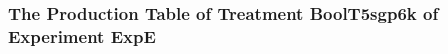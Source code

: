  \begin{frame}
 \fontsize{8pt}{9pt}\selectfont
 \frametitle{ The Production Table of Treatment BoolT5sgp6k of Experiment ExpE }

 \label{ExpEGrammarTable014.tex}  
 \end{frame}

